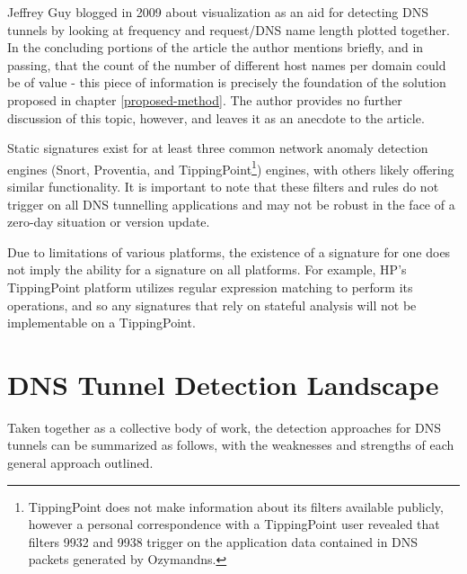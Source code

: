 \documentclass[12pt]{report}
\theoremstyle{remark}
\theoremstyle{definition}
\theoremstyle{definition}
\theoremstyle{definition}
\begin{document}
Jeffrey Guy\cite{Guy2009} blogged in 2009 about visualization as an aid for
detecting DNS tunnels by looking at frequency and request/DNS name length
plotted together. In the concluding portions of the article the author mentions
briefly, and in passing, that the count of the number of different host names
per domain could be of value - this piece of information is precisely the
foundation of the solution proposed in chapter \ref{proposed-method}. The author
provides no further discussion of this topic, however, and leaves it as an
anecdote to the article.

Static signatures exist for at least three common network anomaly detection
engines (Snort\cite{Chamberland2009.snort_iodine},
Proventia\cite{Proventia2013.ips_tunnel}, and TippingPoint\footnote{TippingPoint
does not make information about its filters available publicly,
however a personal correspondence with a TippingPoint user revealed that filters
9932 and 9938 trigger on the application data contained in DNS packets generated
by Ozymandns.}) engines, with others likely offering similar functionality. It
is important to note that these filters and rules do not trigger on all DNS
tunnelling applications and may not be robust in the face of a zero-day
situation or version update.

Due to limitations of various platforms, the existence of a signature for one
does not imply the ability for a signature on all platforms. For example, HP's
TippingPoint platform utilizes regular expression matching to perform its
operations, and so any signatures that rely on stateful analysis will not be
implementable on a TippingPoint.

\section{DNS Tunnel Detection Landscape}
\label{litreview-summary}
Taken
together as a collective body of work, the detection approaches for DNS tunnels
can be summarized as follows, with the weaknesses and strengths of each general
approach outlined.
\end{document}
